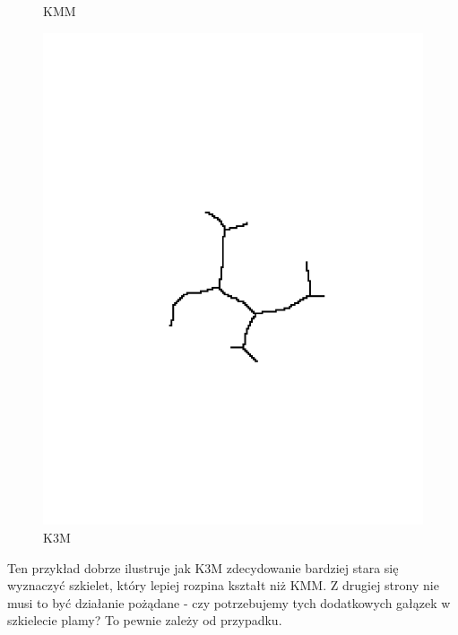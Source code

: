 \documentclass[11pt]{article}
\begin{document}
\begin{figure}[!ht]
\begin{minipage}[b]{0.5\linewidth}
    \caption{KMM} 
    \vspace{4ex}
  \end{minipage}%
  \begin{minipage}[b]{0.5\linewidth}
    \centering
    \includegraphics[width=.5\linewidth]{../samples/blob_k3m} 
    \caption{K3M} 
    \vspace{4ex}
  \end{minipage} 
\end{figure}
\FloatBarrier

\par
Ten przykład dobrze ilustruje jak K3M zdecydowanie bardziej stara się wyznaczyć szkielet, który lepiej rozpina kształt niż KMM. Z drugiej strony nie musi to być działanie pożądane - czy potrzebujemy tych dodatkowych gałązek w szkielecie plamy? To pewnie zależy od przypadku.
\end{document}
